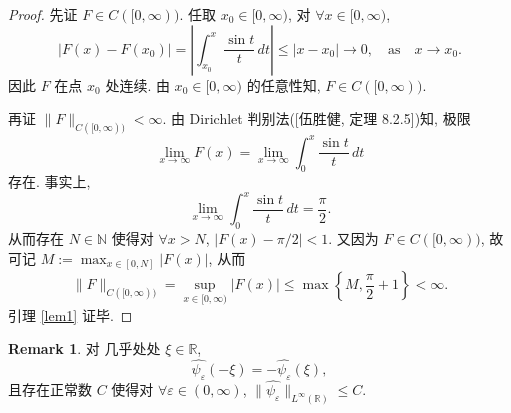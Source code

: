 \documentclass[a4paper,11pt]{article}
\theoremstyle{definition}
\newtheorem{remark}[theorem]{Remark}
\begin{document}
\begin{proof} 
    先证 $ F \in C([0, \infty)) $. 任取 $ x_0 \in [0, \infty) $,
    对 $ \forall x \in [0, \infty) $,
    $$
        |F(x) - F(x_0)|
            = \left| \int_{x_0}^x \frac{\sin t}{t} \, dt \right|
            \leq |x - x_0|
            \to 0, \quad \text{as} \quad x \to x_0.
    $$
    因此 $ F $ 在点 $ x_0 $ 处连续. 由 $ x_0 \in [0, \infty) $ 的任意性知, $ F \in C([0, \infty)) $.

    再证 $ \| F \|_{C([0, \infty))} < \infty $.
    由 Dirichlet 判别法([伍胜健, 定理 8.2.5])知, 极限
    $$
        \lim_{x \to \infty} F(x) 
            = \lim_{x \to \infty} \int_0^x \frac{\sin t}{t} \, dt
    $$
    存在. 事实上,
    $$
        \lim_{x \to \infty} \int_0^x \frac{\sin t}{t} \, dt = \frac{\pi}{2}.
    $$ 
    从而存在 $ N \in \mathbb{N} $ 使得对 $ \forall x > N $, $ |F(x) - \pi/2| < 1 $.
    又因为 $ F \in C([0, \infty)) $, 故可记 $ M := \max_{x \in [0, N]} |F(x)| $, 
    从而
    $$
        \| F \|_{C([0, \infty))} = \sup_{x \in [0, \infty)} |F(x)| 
            \leq \max \left\{M, \frac{\pi}{2} + 1 \right\} < \infty.
    $$
    引理 \ref{lem1} 证毕.
\end{proof}

\begin{remark}  \label{remark3}
    对 几乎处处 $ \xi \in \mathbb{R} $, 
    $$ 
        \widehat{\psi_\varepsilon} (- \xi)
            = - \widehat{\psi_\varepsilon} (\xi),
    $$
    且存在正常数 $ C $ 使得对 $ \forall \varepsilon \in (0, \infty) $, 
    $ \| \widehat{\psi_\varepsilon} \|_{L^\infty(\mathbb{R})} \leq C $.
\end{remark}
 
\end{document}
